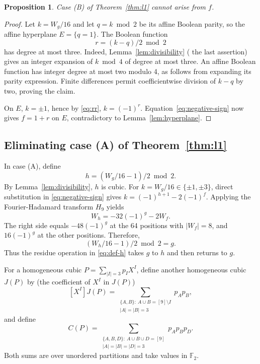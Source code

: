 \documentclass[11pt]{article}
\newtheorem{proposition}{Proposition}
\newtheorem{open problem}{Open problem}
\begin{document}
\begin{proposition}\label{prop:no-B}
Case (B) of Theorem~\ref{thm:l1} cannot arise from $f$.
\end{proposition}
\begin{proof}
Let $k=W_g/16$ and let $q=k\bmod2$ be its affine Boolean parity, so the affine hyperplane $E=\{q=1\}$. The Boolean function
\begin{equation}\label{eq:rr}
r=(k-q)/2\bmod2
\end{equation}
has degree at most three. Indeed, Lemma~\ref{lem:divisibility} ( the last assertion) gives an integer expansion of $k\bmod4$ of degree at most three. An affine Boolean function has integer degree at most two modulo 4, as follows from expanding its parity expression. Finite differences permit coefficientwise division of $k-q$ by two, proving the claim.

On $E$, $k=\pm1$, hence by \eqref{eq:rr}, $k=(-1)^r$. Equation~\eqref{eq:negative-sign} now gives $f=1+r$ on $E$, contradictory to Lemma~\ref{lem:hyperplane}.
\end{proof}

\subsection{Eliminating case (A) of Theorem~\ref{thm:l1}}

In case (A), define
\begin{equation}\label{eq:def-h}
h=(W_g/16-1)/2\bmod2.
\end{equation}
By Lemma~\ref{lem:divisibility}, $h$ is cubic. For $k=W_g/16\in\{\pm1,\pm3\}$, direct substitution in \eqref{eq:negative-sign} gives $k=(-1)^{h+1}-2(-1)^f$. Applying the Fourier-Hadamard transform $H_9$ yields
\begin{equation}\label{eq:second-transform}
W_h=-32(-1)^g-2W_f.
\end{equation}
The right side equals $-48(-1)^g$ at the 64 positions with $|W_f|=8$, and $16(-1)^g$ at the other positions. Therefore,
\begin{equation}\label{eq:residue-involution}
(W_h/16-1)/2\bmod2=g.
\end{equation}
Thus the residue operation in \eqref{eq:def-h} takes $g$ to $h$ and then returns to $g$.

For a homogeneous cubic $P=\sum_{|I|=3}p_I X^I$, define another homogeneous cubic $J(P)$ by (the coefficient of $X^I$ in $J(P)$)
\begin{equation}\label{eq:J}
[X^I]J(P)=\sum_{\substack{\{A,B\}:\ A\cup B=[9]\setminus I\\|A|=|B|=3}}p_Ap_B,
\end{equation}
and define
\begin{equation}\label{eq:C}
C(P)=\sum_{\substack{\{A,B,D\}:\ A\cup B\cup D=[9]\\|A|=|B|=|D|=3}}p_Ap_Bp_D.
\end{equation}
Both sums are over unordered partitions and take values in $\mathbb{F}_2$.
\end{document}
